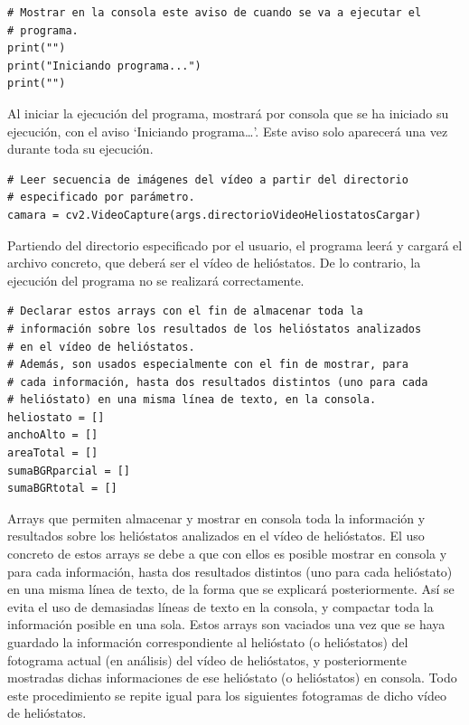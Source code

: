 \begin{lstlisting}
# Mostrar en la consola este aviso de cuando se va a ejecutar el
# programa.
print("")
print("Iniciando programa...")
print("")
\end{lstlisting}

Al iniciar la ejecución del programa, mostrará por consola que se ha iniciado su ejecución, con el aviso ‘Iniciando programa…’. Este aviso solo aparecerá una vez durante toda su ejecución.\\[20pt]

\begin{lstlisting}
# Leer secuencia de imágenes del vídeo a partir del directorio
# especificado por parámetro.
camara = cv2.VideoCapture(args.directorioVideoHeliostatosCargar)
\end{lstlisting}

Partiendo del directorio especificado por el usuario, el programa leerá y cargará el archivo concreto, que deberá ser el vídeo de helióstatos. De lo contrario, la ejecución del programa no se realizará correctamente.\\[20pt]

\begin{lstlisting}
# Declarar estos arrays con el fin de almacenar toda la
# información sobre los resultados de los helióstatos analizados
# en el vídeo de helióstatos.
# Además, son usados especialmente con el fin de mostrar, para
# cada información, hasta dos resultados distintos (uno para cada
# helióstato) en una misma línea de texto, en la consola.
heliostato = []
anchoAlto = []
areaTotal = []
sumaBGRparcial = []
sumaBGRtotal = []
\end{lstlisting}

Arrays que permiten almacenar y mostrar en consola toda la información y resultados sobre los helióstatos analizados en el vídeo de helióstatos. El uso concreto de estos arrays se debe a que con ellos es posible mostrar en consola y para cada información, hasta dos resultados distintos (uno para cada helióstato) en una misma línea de texto, de la forma que se explicará posteriormente. Así se evita el uso de demasiadas líneas de texto en la consola, y compactar toda la información posible en una sola. Estos arrays son vaciados una vez que se haya guardado la información correspondiente al helióstato (o helióstatos) del fotograma actual (en análisis) del vídeo de helióstatos, y posteriormente mostradas dichas informaciones de ese helióstato (o helióstatos) en consola. Todo este procedimiento se repite igual para los siguientes fotogramas de dicho vídeo de helióstatos.\\[20pt]

